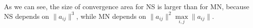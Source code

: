 \documentclass[12pt]{article}
\begin{document}
\noindent As we can see, the size of convergence area for {\sf NS} is larger than for {\sf MN}, because {\sf NS} depends on $\|a_{ij}\|^3$, while {\sf MN} depends on $\|a_{ij}\|^2\max\limits_{i,j}\|a_{ij}\|$. 




\clearpage






\end{document}
